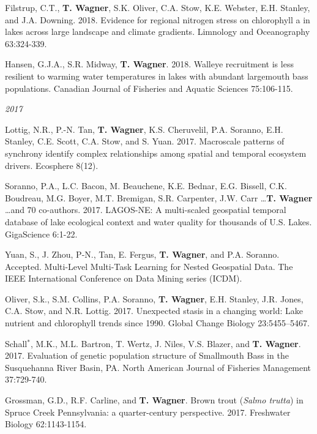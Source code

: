 \documentclass[10pt]{article}
\begin{document}
\begin{flushleft}
\begin{etaremune}[start=81]
\item Filstrup, C.T., {\bf T. Wagner}, S.K. Oliver, C.A. Stow, K.E. Webster, E.H. Stanley, and J.A. Downing. 2018. Evidence for regional nitrogen stress on chlorophyll a in lakes across large landscape and climate gradients. Limnology and Oceanography 63:324-339.

\item Hansen, G.J.A., S.R. Midway, {\bf T. Wagner}. 2018. Walleye recruitment is less resilient to warming water temperatures in lakes with abundant largemouth bass populations. Canadian Journal of Fisheries and Aquatic Sciences 75:106-115.

\end{etaremune}
\emph{2017}
\begin{etaremune}[start=68]

\item Lottig, N.R., P.-N. Tan, {\bf T. Wagner}, K.S. Cheruvelil, P.A. Soranno, E.H. Stanley, C.E. Scott, C.A. Stow, and S. Yuan. 2017. Macroscale patterns of synchrony identify complex relationships among spatial and temporal ecosystem drivers. Ecosphere 8(12).

\item Soranno, P.A., L.C. Bacon, M. Beauchene, K.E. Bednar, E.G. Bissell, C.K. Boudreau, M.G. Boyer, M.T. Bremigan, S.R. Carpenter, J.W. Carr \ldots  {\bf T. Wagner} \ldots  and 70 co-authors. 2017. LAGOS-NE: A multi-scaled geospatial temporal database of lake ecological context and water quality for thousands of U.S. Lakes. GigaScience 6:1-22.

\item Yuan, S., J. Zhou, P-N., Tan, E. Fergus, {\bf T. Wagner}, and P.A. Soranno. Accepted. Multi-Level Multi-Task Learning for Nested Geospatial Data. The IEEE International Conference on Data Mining series (ICDM).

\item Oliver, S.k., S.M. Collins, P.A. Soranno, {\bf T. Wagner}, E.H. Stanley, J.R. Jones, C.A. Stow, and N.R. Lottig. 2017. Unexpected stasis in a changing world: Lake nutrient and chlorophyll trends since 1990. Global Change Biology 23:5455–5467.

\item Schall$^*$, M.K., M.L. Bartron, T. Wertz, J. Niles, V.S. Blazer, and {\bf T. Wagner}. 2017. Evaluation of genetic population structure of Smallmouth Bass in the Susquehanna River Basin, PA. North American Journal of Fisheries Management 37:729-740.

\item Grossman, G.D., R.F. Carline, and {\bf T. Wagner}. Brown trout (\emph{Salmo trutta}) in Spruce Creek Pennsylvania: a quarter-century perspective. 2017. Freshwater Biology 62:1143-1154.


\end{etaremune}
\end{flushleft}
\end{document}
